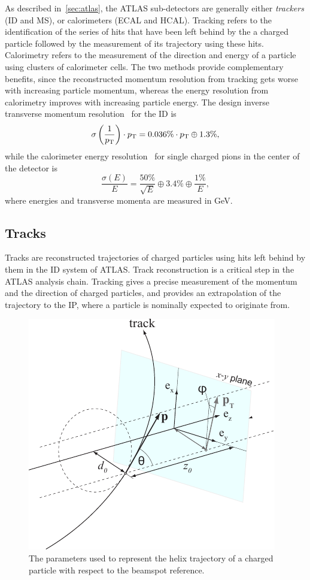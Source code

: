As described in~\cref{sec:atlas}, the ATLAS sub-detectors are generally either \textit{trackers} (ID and MS), or calorimeters (ECAL and HCAL). Tracking refers to the identification of the series of hits that have been left behind by the a charged particle followed by the measurement of its trajectory using these hits. Calorimetry refers to the measurement of the direction and energy of a particle using clusters of calorimeter cells. The two methods provide complementary benefits, since the reconstructed momentum resolution from tracking gets worse with increasing particle momentum, whereas the energy resolution from calorimetry improves with increasing particle energy. The design inverse transverse momentum resolution~\cite{PERF-2015-09} for the ID is
\begin{equation}
    \sigma \left( \frac{1}{p_\mathrm{T}} \right) \cdot p_\mathrm{T} = 0.036\% \cdot p_\mathrm{T} \oplus 1.3\% ,
\end{equation}
while the calorimeter energy resolution~\cite{PERF-2015-09} for single charged pions in the center of the detector is
\begin{equation}
    \frac{\sigma\left(E\right)}{E}=\frac{50\%}{\sqrt{E}}\oplus3.4\%\oplus\frac{1\%}{E},
\end{equation}
where energies and transverse momenta are measured in GeV.

\subsection{Tracks}

Tracks are reconstructed trajectories of charged particles using hits left behind by them in the ID system of ATLAS. Track reconstruction is a critical step in the ATLAS analysis chain. Tracking gives a precise measurement of the momentum and the direction of charged particles, and provides an extrapolation of the trajectory to the IP, where a particle is nominally expected to originate from. 

\begin{figure}[!ht]
    \centering
    \includegraphics[width=0.6\linewidth]{figures/experiment/trackCoordinates.pdf}
    \caption{The parameters used to represent the helix trajectory of a charged particle with respect to the beamspot reference.~\cite{trk-tutorial-web}}
    \label{fig:track-coords}
\end{figure}

